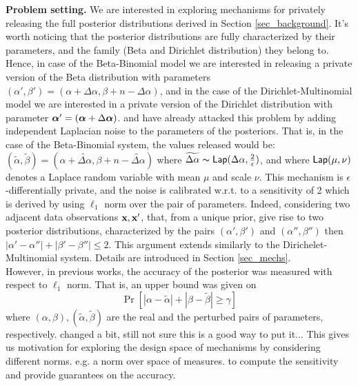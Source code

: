 \documentclass{article}
\begin{document}
\noindent \textbf{Problem setting.}
\label{subsec_problem}
We are interested in exploring mechanisms for privately releasing the full posterior
distributions derived in Section \ref{sec_background}.
It's worth noticing that the posterior distributions are fully characterized
by their parameters, and the family (Beta and Dirichlet distribution) they belong to. Hence, in case of the
Beta-Binomial model we are interested in releasing a private version of the Beta distribution with 
parameters $(\alpha',\beta')=(\alpha + \Delta \alpha,\beta + n - \Delta \alpha)$, and
in the case of the Dirichlet-Multinomial model we are interested in a private version of the Dirichlet distribution with parameter
$\boldsymbol{\alpha}'=(\boldsymbol{\alpha} + \Delta \boldsymbol{\alpha})$. \cite{zhang2016differential} and \cite{xiao2012bayesian}
have already attacked this problem by adding independent Laplacian noise to the
parameters of the posteriors. That is, in the case of the Beta-Binomial system,
the values released would be: $(\tilde\alpha,\tilde\beta)=(\alpha +  \widetilde{\Delta \alpha},\beta + n - \widetilde{\Delta \alpha})$
where $\widetilde{\Delta \alpha}\thicksim \mathsf{Lap}(\Delta \alpha, \frac{2}{\epsilon})$,
and where $\mathsf{Lap}(\mu, \nu)$ denotes a Laplace random variable with mean $\mu$ and scale $\nu$.
This mechanism is $\epsilon$-differentially private, and the noise is
calibrated w.r.t. to a sensitivity of 2 which is derived by using
$\ell_1$ norm over the pair of parameters. Indeed, considering two
adjacent data observations $\textbf{x}, \textbf{x}'$, that, from a unique prior, give rise to two posterior
distributions, characterized by the pairs
$(\alpha',\beta')$ and $(\alpha'',\beta'')$ then
$|\alpha'-\alpha''|+|\beta'-\beta''|\leq 2$.
This argument extends similarly to the Dirichelet-Multinomial system. Details are introduced in Section \ref{sec_mechs}.\\
However, in previous works, the accuracy of the posterior was measured with respect to $\ell_1$ norm. That is, an upper bound was given on
\[
  \Pr[|\alpha - \tilde\alpha| + |\beta - \tilde\beta |\geq \gamma ]
\]
where $(\alpha, \beta), (\tilde\alpha,\tilde\beta)$ are the real and the perturbed pairs of parameters, respectively.
{\color{blue} changed a bit, still not sure this is a good way to put it...}
This gives us motivation for exploring the design space
of mechanisms by considering different norms. e.g. a norm over space of measures.
to compute the sensitivity and provide guarantees on the accuracy.
\end{document}
